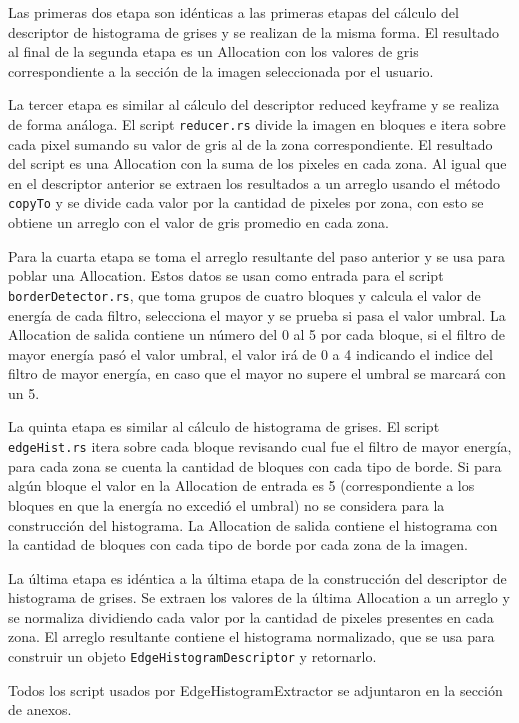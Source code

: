 Las primeras dos etapa son idénticas a las primeras etapas del cálculo del descriptor de histograma de grises y se realizan de la misma forma. El resultado al final de la segunda etapa es un Allocation con los valores de gris correspondiente a la sección de la imagen seleccionada por el usuario.

La tercer etapa es similar al cálculo del descriptor reduced keyframe y se realiza de forma análoga. El script \texttt{reducer.rs} divide la imagen en bloques e itera sobre cada pixel sumando su valor de gris al de la zona correspondiente. El resultado del script es una Allocation con la suma de los pixeles en cada zona. Al igual que en el descriptor anterior se extraen los resultados a un arreglo usando el método \texttt{copyTo} y se divide cada valor por la cantidad de pixeles por zona, con esto se obtiene un arreglo con el valor de gris promedio en cada zona.

Para la cuarta etapa se toma el arreglo resultante del paso anterior y se usa para poblar una Allocation. Estos datos se usan como entrada para el script \texttt{borderDetector.rs}, que toma grupos de cuatro bloques y calcula el valor de energía de cada filtro, selecciona el mayor y se prueba si pasa el valor umbral. La Allocation de salida contiene un número del 0 al 5 por cada bloque, si el filtro de mayor energía pasó el valor umbral, el valor irá de 0 a 4 indicando el indice del filtro de mayor energía, en caso que el mayor no supere el umbral se marcará con un 5.

La quinta etapa es similar al cálculo de histograma de grises. El script \texttt{edgeHist.rs} itera sobre cada bloque revisando cual fue el filtro de mayor energía, para cada zona se cuenta la cantidad de bloques con cada tipo de borde. Si para algún bloque el valor en la Allocation de entrada es 5 (correspondiente a los bloques en que la energía no excedió el umbral) no se considera para la construcción del histograma. La Allocation de salida contiene el histograma con la cantidad de bloques con cada tipo de borde por cada zona de la imagen.

La última etapa es idéntica a la última etapa de la construcción del descriptor de histograma de grises. Se extraen los valores de la última Allocation a un arreglo y se normaliza dividiendo cada valor por la cantidad de pixeles presentes en cada zona. El arreglo resultante contiene el histograma normalizado, que se usa para construir un objeto \texttt{EdgeHistogramDescriptor} y retornarlo.

Todos los script usados por EdgeHistogramExtractor se adjuntaron en la sección de anexos.\\

